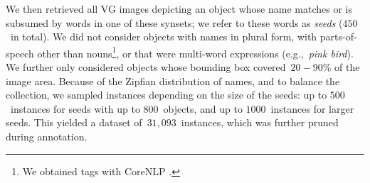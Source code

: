We then retrieved all VG images depicting an object whose name matches or is subsumed by words in one of these synsets; we refer to these words as \textit{seeds} ($450$\ in total).
We did not consider objects with names in plural form, with parts-of-speech other than nouns\footnote{We obtained tags with CoreNLP \cite{manning2014stanford}.}, or that were multi-word expressions (e.g.,~\textsl{pink bird}). 
We further only considered objects whose bounding box covered~\mbox{$20-90\%$} of the image area.
Because of the Zipfian distribution of names, and to balance the collection, we sampled instances depending on the size of the seeds: up to $500$\ instances for seeds with up to $800$\ objects, and up to $1000$\ instances for larger seeds. %
This yielded a dataset of\ $31,093$~instances, which was further pruned during annotation. 
